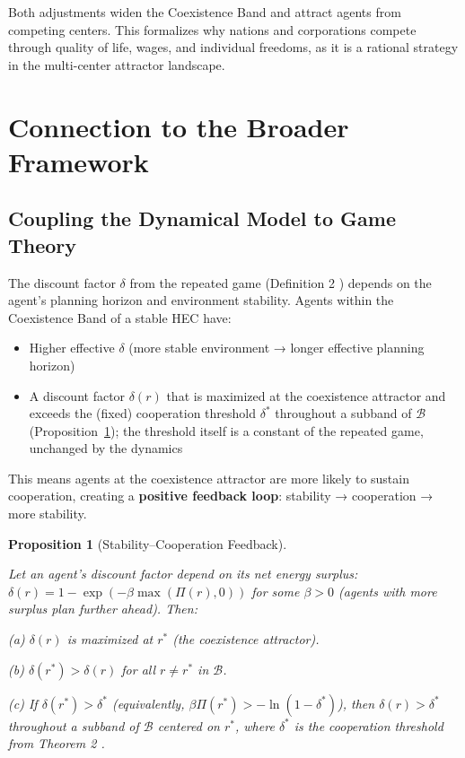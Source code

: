 \documentclass[11pt]{article}
\theoremstyle{plain}
\newtheorem{proposition}[theorem]{Proposition}
\theoremstyle{definition}
\theoremstyle{remark}
\let\origsection\section
\renewcommand{\section}{\needspace{12\baselineskip}\origsection}
\let\origsubsection\subsection
\renewcommand{\subsection}{\needspace{7\baselineskip}\origsubsection}
\providecommand{\tightlist}{%
  \setlength{\itemsep}{0pt}\setlength{\parskip}{0pt}}
\begin{document}
Both adjustments widen the Coexistence Band and attract agents from
competing centers. This formalizes why nations and corporations compete
through quality of life, wages, and individual freedoms, as it is a
rational strategy in the multi-center attractor landscape.

\section{Connection to the Broader
Framework}\label{connection-to-the-broader-framework}

\subsection{Coupling the Dynamical Model to Game
Theory}\label{coupling-the-dynamical-model-to-game-theory}

The discount factor \(\delta\) from the repeated game (Definition 2
\citep{TC-V}) depends on the agent's planning horizon and environment
stability. Agents within the Coexistence Band of a stable HEC have:

\begin{itemize}
\tightlist
\item
  Higher effective \(\delta\) (more stable environment → longer
  effective planning horizon)
\item
  A discount factor \(\delta(r)\) that is maximized at the coexistence
  attractor and exceeds the (fixed) cooperation threshold \(\delta^*\)
  throughout a subband of \(\mathcal{B}\)
  (Proposition~\ref{prop-stability-cooperation-feedback}); the threshold
  itself is a constant of the repeated game, unchanged by the dynamics
\end{itemize}

This means agents at the coexistence attractor are more likely to
sustain cooperation, creating a \textbf{positive feedback loop}:
stability → cooperation → more stability.

\begin{proposition}[Stability–Cooperation Feedback]
\label{prop-stability-cooperation-feedback}

Let an agent's discount factor depend on its net energy surplus: $\delta(r) = 1 - \exp(-\beta \max(\Pi(r), 0))$ for some $\beta > 0$ (agents with more surplus plan further ahead). Then:

(a) $\delta(r)$ is maximized at $r^*$ (the coexistence attractor).

(b) $\delta(r^*)> \delta(r)$ for all $r \neq r^*$ in $\mathcal{B}$.

(c) If $\delta(r^*) > \delta^*$ (equivalently, $\beta \Pi(r^*) > -\ln(1-\delta^*)$), then $\delta(r) > \delta^*$ throughout a subband of $\mathcal{B}$ centered on $r^*$, where $\delta^*$ is the cooperation threshold from Theorem 2 \citep{TC-V}.
\end{proposition}
\end{document}
